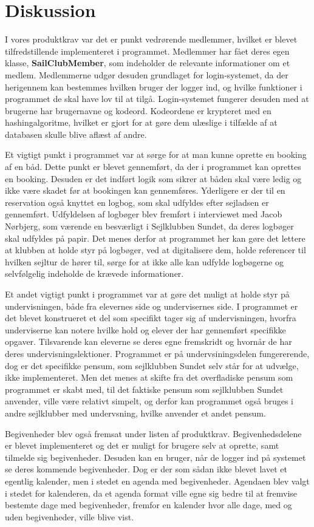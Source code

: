 \chapter{Diskussion}
I vores produktkrav var det er punkt vedrørende medlemmer, hvilket er blevet tilfredstillende implementeret i programmet. 
Medlemmer har fået deres egen klasse, \textbf{SailClubMember}, som indeholder de relevante informationer om et medlem. 
Medlemmerne udgør desuden grundlaget for login-systemet, da der herigennem kan bestemmes hvilken bruger der logger ind, og hvilke funktioner i programmet de skal have lov til at tilgå. 
Login-systemet fungerer desuden med at brugerne har brugernavne og kodeord. 
Kodeordene er krypteret med en hashingalgoritme, hvilket er gjort for at gøre dem ulæslige i tilfælde af at databasen skulle blive aflæst af andre. 

Et vigtigt punkt i programmet var at sørge for at man kunne oprette en booking af en båd. 
Dette punkt er blevet gennemført, da der i programmet kan oprettes en booking. 
Desuden er det indført logik som sikrer at båden skal være ledig og ikke være skadet før at bookingen kan gennemføres. 
Yderligere er der til en reservation også knyttet en logbog, som skal udfyldes efter sejladsen er gennemført. 
Udfyldelsen af logbøger blev fremført i interviewet med Jacob Nørbjerg, som værende en besværligt i Sejlklubben Sundet, da deres logbøger skal udfyldes på papir. 
Det menes derfor at programmet her kan gøre det lettere at klubben at holde styr på logbøger, ved at digitalisere dem, holde referencer til hvilken sejltur de hører til, sørge for at ikke alle kan udfylde logbøgerne og selvfølgelig indeholde de krævede informationer. 

Et andet vigtigt punkt i programmet var at gøre det muligt at holde styr på undervisningen, både fra elevernes side og undervisernes side. 
I programmet er det blevet konstrueret et del som specifikt tager sig af undervisningen, hvorfra underviserne kan notere hvilke hold og elever der har gennemført specifikke opgaver.
Tilsvarende kan eleverne se deres egne fremskridt og hvornår de har deres undervisningslektioner.
Programmet er på undervsiningsdelen fungererende, dog er det specifikke pensum, som sejlklubben Sundet selv står for at udvælge, ikke implementeret. 
Men det menes at skifte fra det overfladiske pensum som programmet er skabt med, til det faktiske pensum som sejlklubben Sundet anvender, ville være relativt simpelt, og derfor kan programmet også bruges i andre sejlklubber med undervsning, hvilke anvender et andet pensum.

Begivenheder blev også fremsat under listen af produktkrav.
Begivenhedsdelene er blevet implementeret og det er muligt for brugere selv at oprette, samt tilmelde sig begivenheder.
Desuden kan en bruger, når de logger ind på systemet se deres kommende begivenheder.
Dog er der som sådan ikke blevet lavet et egentlig kalender, men i stedet en agenda med begivenheder.
Agendaen blev valgt i stedet for kalenderen, da et agenda format ville egne sig bedre til at fremvise bestemte dage med begivenheder, fremfor en kalender hvor alle dage, med og uden begivenheder, ville blive vist.